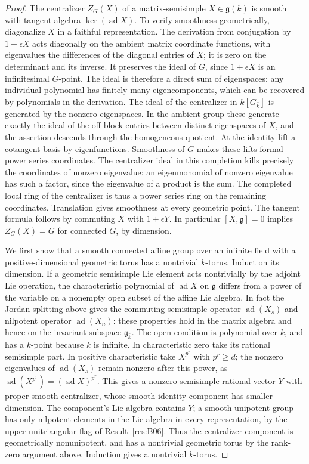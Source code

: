 \documentclass[11pt,a4paper,openany,oneside]{book}
\theoremstyle{resultstyle}
\theoremstyle{definition}
\numberwithin{equation}{chapter}
\begin{document}
\begin{proof}
The centralizer \(Z_G(X)\) of a matrix-semisimple
\(X\in\mathfrak g(k)\) is smooth with tangent algebra
\(\ker(\operatorname{ad} X)\).
To verify smoothness geometrically, diagonalize \(X\) in a
faithful representation. The derivation from conjugation
by \(1+\epsilon X\) acts diagonally on the ambient matrix
coordinate functions, with eigenvalues the differences of
the diagonal entries of \(X\); it is zero on the determinant
and its inverse. It preserves the ideal of \(G\), since
\(1+\epsilon X\) is an infinitesimal \(G\)-point. The ideal
is therefore a direct sum of eigenspaces: any individual
polynomial has finitely many eigencomponents, which can be
recovered by polynomials in the derivation. The ideal of the
centralizer in \(k[G_{\bar k}]\) is generated by the nonzero
eigenspaces. In the ambient group these generate exactly the
ideal of the off-block entries between distinct eigenspaces
of \(X\), and the assertion descends through the homogeneous
quotient. At the identity lift a cotangent basis by
eigenfunctions. Smoothness of \(G\) makes these lifts formal
power series coordinates. The centralizer ideal in this
completion kills precisely the coordinates of nonzero
eigenvalue: an eigenmonomial of nonzero eigenvalue has such
a factor, since the eigenvalue of a product is the sum.
The completed local ring of the centralizer is thus a power
series ring on the remaining coordinates. Translation gives
smoothness at every geometric point. The tangent formula
follows by commuting \(X\) with \(1+\epsilon Y\).
In particular \([X,\mathfrak g]=0\) implies \(Z_G(X)=G\)
for connected \(G\), by dimension.

We first show that a smooth connected affine group over an
infinite field with a positive-dimensional geometric torus
has a nontrivial \(k\)-torus. Induct on its dimension.
If a geometric semisimple Lie element acts nontrivially
by the adjoint Lie operation, the characteristic polynomial
of \(\operatorname{ad} X\) on \(\mathfrak g\) differs from
a power of the variable on a nonempty open subset of the
affine Lie algebra. In fact the Jordan splitting above
gives the commuting semisimple operator
\(\operatorname{ad}(X_s)\) and nilpotent operator
\(\operatorname{ad}(X_n)\): these properties hold in the
matrix algebra and hence on the invariant subspace
\(\mathfrak g_{\bar k}\). The open condition is polynomial
over \(k\), and has a \(k\)-point because \(k\) is infinite.
In characteristic zero take its rational semisimple part.
In positive characteristic take \(X^{p^r}\) with \(p^r\ge d\);
the nonzero eigenvalues of \(\operatorname{ad}(X_s)\) remain
nonzero after this power, as
\(\operatorname{ad}(X^{p^r})=(\operatorname{ad} X)^{p^r}\).
This gives a nonzero semisimple rational vector \(Y\)
with proper smooth centralizer, whose smooth identity
component has smaller dimension. The component's Lie
algebra contains \(Y\); a smooth unipotent group has only
nilpotent elements in the Lie algebra in every representation,
by the upper unitriangular flag of Result~\ref{res:B06}.
Thus the centralizer component is geometrically nonunipotent,
and has a nontrivial geometric torus by the rank-zero
argument above. Induction gives a nontrivial \(k\)-torus.


\end{proof}
\end{document}
